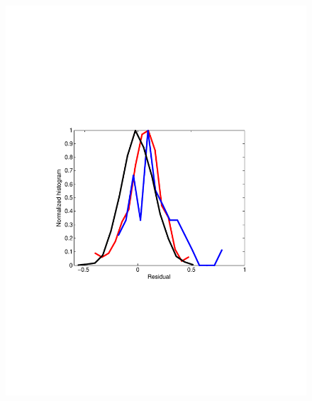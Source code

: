 \begin{figure}
\begin{minipage}[c]{0.30\hsize}
\includegraphics[width=\hsize]{../figs/Figure10b_residuals_baseglm}
\end{minipage}
\begin{minipage}[c]{0.30\hsize}

\end{minipage}
\end{figure}

